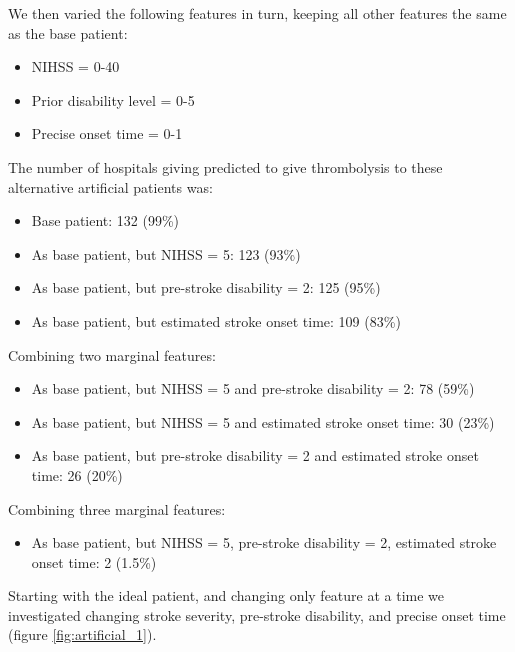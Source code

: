 We then varied the following features in turn, keeping all other features
the same as the base patient:

\begin{itemize}
\item NIHSS = 0-40
\item Prior disability level = 0-5
\item Precise onset time = 0-1
\end{itemize}

The number of hospitals giving predicted to give thrombolysis to these alternative artificial patients was:

\begin{itemize}
\item Base patient: 132 (99\%)
\item As base patient, but NIHSS = 5: 123 (93\%)
\item As base patient, but pre-stroke disability = 2: 125 (95\%)
\item As base patient, but estimated stroke onset time: 109 (83\%)
\end{itemize}

Combining two marginal features:

\begin{itemize}
\item As base patient, but NIHSS = 5 and pre-stroke disability = 2: 78 (59\%)
\item As base patient, but NIHSS = 5 and estimated stroke onset time: 30 (23\%)
\item As base patient, but pre-stroke disability = 2 and estimated stroke onset time: 26 (20\%)
\end{itemize}

Combining three marginal features:

\begin{itemize}
\item As base patient, but NIHSS = 5, pre-stroke disability = 2, estimated stroke onset time: 2 (1.5\%)
\end{itemize}

Starting with the ideal patient, and changing only feature at a time we investigated changing stroke severity, pre-stroke disability, and precise onset time (figure \ref{fig:artificial_1}).

